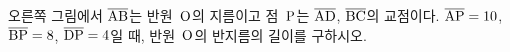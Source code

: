 \noindent\begin{minipage}[t]{0.58\linewidth}\vspace{0pt}\raggedright 오른쪽 그림에서 $\overline{\mathrm{AB}}$는 반원~$\mathrm{O}$의 지름이고 점~$\mathrm{P}$는 $\overline{\mathrm{AD}}$, $\overline{\mathrm{BC}}$의 교점이다. $\overline{\mathrm{AP}}=10$, $\overline{\mathrm{BP}}=8$, $\overline{\mathrm{DP}}=4$일 때, 반원~$\mathrm{O}$의 반지름의 길이를 구하시오.\end{minipage}\hfill\begin{minipage}[t]{0.4\linewidth}\vspace{0pt}\centering \resizebox{\ifdim\width>\linewidth\linewidth\else\width\fi}{!}{}\end{minipage}\par
